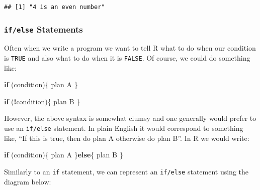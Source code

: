 \documentclass[12pt,]{krantz}
\newenvironment{Shaded}{\begin{snugshade}}{\end{snugshade}}
\newcommand{\KeywordTok}[1]{\textcolor[rgb]{0.27,0.27,0.27}{\textbf{#1}}}
\newcommand{\DecValTok}[1]{\textcolor[rgb]{0.06,0.06,0.06}{#1}}
\newcommand{\StringTok}[1]{\textcolor[rgb]{0.5,0.5,0.5}{#1}}
\newcommand{\ControlFlowTok}[1]{\textcolor[rgb]{0.27,0.27,0.27}{\textbf{#1}}}
\newcommand{\OperatorTok}[1]{\textcolor[rgb]{0.43,0.43,0.43}{\textbf{#1}}}
\newcommand{\NormalTok}[1]{#1}
\begin{document}
\begin{verbatim}
## [1] "4 is an even number"
\end{verbatim}

\begin{Shaded}
\end{Shaded}

\subsubsection{\texorpdfstring{\texttt{if/else}
Statements}{if/else Statements}}\label{ifelse-statements}

Often when we write a program we want to tell R what to do when our
condition is \texttt{TRUE} and also what to do when it is
\texttt{FALSE}. Of course, we could do something like:

\begin{Shaded}
\begin{Highlighting}[]
\ControlFlowTok{if}\NormalTok{ (condition)\{}
\NormalTok{  plan A}
\NormalTok{\}}

\ControlFlowTok{if}\NormalTok{ (}\OperatorTok{!}\NormalTok{condition)\{}
\NormalTok{  plan B}
\NormalTok{\}}
\end{Highlighting}
\end{Shaded}

However, the above syntax is somewhat clumsy and one generally would
prefer to use an \texttt{if/else} statement. In plain English it would
correspond to something like, ``If this is true, then do plan A
otherwise do plan B''. In R we would write:

\begin{Shaded}
\begin{Highlighting}[]
\ControlFlowTok{if}\NormalTok{ (condition)\{}
\NormalTok{  plan A}
\NormalTok{\}}\ControlFlowTok{else}\NormalTok{\{}
\NormalTok{  plan B}
\NormalTok{\}}
\end{Highlighting}
\end{Shaded}

Similarly to an \texttt{if} statement, we can represent an
\texttt{if/else} statement using the diagram below:
\end{document}
